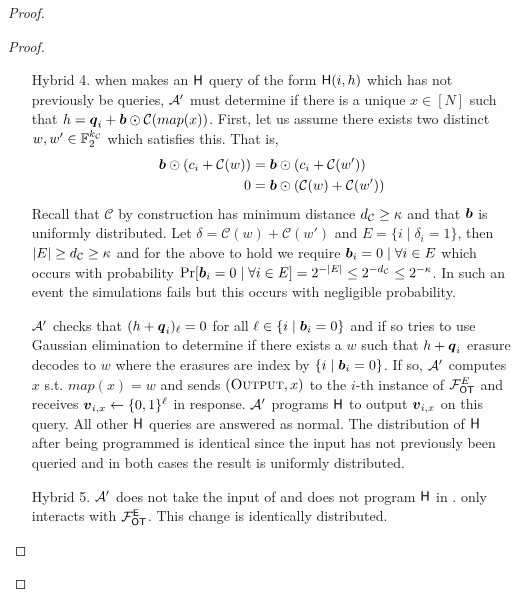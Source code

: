 \begin{proof}
\begin{proof}
\begin{enumerate}[leftmargin=1.8cm]
			
			\item[Hybrid 4.] \label{hybrid:simOutput2} when \send makes an $\mathsf{H}$ query of the form $\mathsf{H}(i,h)$ which has not previously be queries, $\mathcal{A}'$ must determine if there is a unique $x\in[N]$ such that $h=\boldsymbol{q}_i+\boldsymbol{b}\odot \mathcal{C}(map(x))$. First, let us assume there exists two distinct $w,w'\in\mathbb{F}^{{k_\mathcal{C}}}_2$ which satisfies this. That is,
			\begin{align*}
			\boldsymbol{b} \odot (c_i + \mathcal{C}(w)) &= \boldsymbol{b} \odot (c_i + \mathcal{C}(w'))\\
			0 &= \boldsymbol{b} \odot (\mathcal{C}(w) + \mathcal{C}(w'))
			\end{align*}			
			Recall that $\mathcal{C}$ by construction has minimum distance ${d_\mathcal{C}}\geq\kappa$ and that $\boldsymbol{b}$ is uniformly distributed. Let $\delta=\mathcal{C}(w) + \mathcal{C}(w')$ and $E=\{i \mid \delta_i=1\}$, then $|E|\geq {d_\mathcal{C}}\geq \kappa$ and for the above to hold we require $\boldsymbol{b}_i=0 \mid \forall i\in E$ which occurs with probability $\Pr[\boldsymbol{b}_i=0 \mid \forall i\in E]=2^{-|E|}\leq 2^{-{d_\mathcal{C}}}\leq2^{-\kappa}$. In such an event the simulations fails but this occurs with negligible probability.			
			
			$\mathcal{A}'$ checks that $(h+\boldsymbol{q}_i)_\ell =0$ for all $\ell\in \{i \mid \boldsymbol{b}_i=0\}$ and if so tries to use Gaussian elimination to determine if there exists a $w$ such that $h+\boldsymbol{q}_i$ erasure decodes to $w$ where the erasures are index by $\{i \mid \boldsymbol{b}_i=0\}$. If so, $\mathcal{A}'$ computes $x$ s.t. $map(x)=w$ and sends $(\textsc{Output}, x)$ to the $i$-th instance of $\mathcal{F}_{\mathsf{OT}}^E$ and receives $\boldsymbol{v}_{i,x}\gets\{0,1\}^\ell$ in response. $\mathcal{A}'$ programs $\mathsf{H}$ to output $\boldsymbol{v}_{i,x}$ on this query. All other $\mathsf{H}$ queries are answered as normal. The distribution of $\mathsf{H}$ after being programmed is identical since the input has not previously been queried and in both cases the result is uniformly distributed.			
			
			\item[Hybrid 5.] $\mathcal{A}'$ does not take the input of \send and does not program $\mathsf{H}$ in . \send only interacts with $\mathcal{F}_{\mathsf{OT}}^\mathsf{E}$. This change is identically distributed.
		\end{enumerate}
	\end{proof}
\end{proof}

\iffullversion

